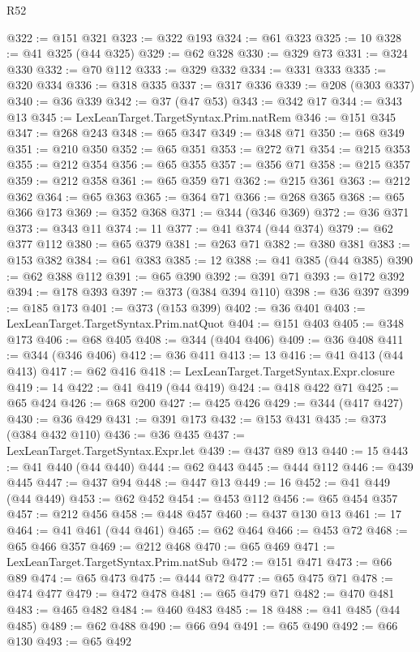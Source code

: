 \begin{lexlean}{R52}
\begin{coremodule}
@322 := @151 @321
@323 := @322 @193
@324 := @61 @323
@325 := 10
@328 := @41 @325 (@44 @325)
@329 := @62 @328
@330 := @329 @73
@331 := @324 @330
@332 := @70 @112
@333 := @329 @332
@334 := @331 @333
@335 := @320 @334
@336 := @318 @335
@337 := @317 @336
@339 := @208 (@303 @337)
@340 := @36 @339
@342 := @37 (@47 @53)
@343 := @342 @17
@344 := @343 @13
@345 := LexLeanTarget.TargetSyntax.Prim.natRem
@346 := @151 @345
@347 := @268 @243
@348 := @65 @347
@349 := @348 @71
@350 := @68 @349
@351 := @210 @350
@352 := @65 @351
@353 := @272 @71
@354 := @215 @353
@355 := @212 @354
@356 := @65 @355
@357 := @356 @71
@358 := @215 @357
@359 := @212 @358
@361 := @65 @359 @71
@362 := @215 @361
@363 := @212 @362
@364 := @65 @363
@365 := @364 @71
@366 := @268 @365
@368 := @65 @366 @173
@369 := @352 @368
@371 := @344 (@346 @369)
@372 := @36 @371
@373 := @343 @11
@374 := 11
@377 := @41 @374 (@44 @374)
@379 := @62 @377 @112
@380 := @65 @379
@381 := @263 @71
@382 := @380 @381
@383 := @153 @382
@384 := @61 @383
@385 := 12
@388 := @41 @385 (@44 @385)
@390 := @62 @388 @112
@391 := @65 @390
@392 := @391 @71
@393 := @172 @392
@394 := @178 @393
@397 := @373 (@384 @394 @110)
@398 := @36 @397
@399 := @185 @173
@401 := @373 (@153 @399)
@402 := @36 @401
@403 := LexLeanTarget.TargetSyntax.Prim.natQuot
@404 := @151 @403
@405 := @348 @173
@406 := @68 @405
@408 := @344 (@404 @406)
@409 := @36 @408
@411 := @344 (@346 @406)
@412 := @36 @411
@413 := 13
@416 := @41 @413 (@44 @413)
@417 := @62 @416
@418 := LexLeanTarget.TargetSyntax.Expr.closure
@419 := 14
@422 := @41 @419 (@44 @419)
@424 := @418 @422 @71
@425 := @65 @424
@426 := @68 @200
@427 := @425 @426
@429 := @344 (@417 @427)
@430 := @36 @429
@431 := @391 @173
@432 := @153 @431
@435 := @373 (@384 @432 @110)
@436 := @36 @435
@437 := LexLeanTarget.TargetSyntax.Expr.let
@439 := @437 @89 @13
@440 := 15
@443 := @41 @440 (@44 @440)
@444 := @62 @443
@445 := @444 @112
@446 := @439 @445
@447 := @437 @94
@448 := @447 @13
@449 := 16
@452 := @41 @449 (@44 @449)
@453 := @62 @452
@454 := @453 @112
@456 := @65 @454 @357
@457 := @212 @456
@458 := @448 @457
@460 := @437 @130 @13
@461 := 17
@464 := @41 @461 (@44 @461)
@465 := @62 @464
@466 := @453 @72
@468 := @65 @466 @357
@469 := @212 @468
@470 := @65 @469
@471 := LexLeanTarget.TargetSyntax.Prim.natSub
@472 := @151 @471
@473 := @66 @89
@474 := @65 @473
@475 := @444 @72
@477 := @65 @475 @71
@478 := @474 @477
@479 := @472 @478
@481 := @65 @479 @71
@482 := @470 @481
@483 := @465 @482
@484 := @460 @483
@485 := 18
@488 := @41 @485 (@44 @485)
@489 := @62 @488
@490 := @66 @94
@491 := @65 @490
@492 := @66 @130
@493 := @65 @492

\end{coremodule}
\end{lexlean}
